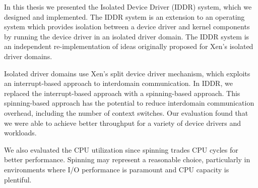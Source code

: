 
In this thesis we presented the Isolated Device Driver (IDDR) system,
which we designed and implemented. 
The IDDR system is an extension to an operating system which provides isolation between
a device driver and kernel components by running the device
driver in an isolated driver domain. The IDDR system is an independent re-implementation 
of ideas originally proposed for Xen's isolated driver domains.

Isolated driver domains use Xen's split device driver
mechanism, which exploits an interrupt-based approach to interdomain communication. 
In IDDR, we replaced the interrupt-based
approach with a spinning-based approach. This spinning-based approach
has the potential to reduce interdomain communication overhead, including
the number of context switches.   Our evaluation found that we were able
to achieve better throughput for a variety of device drivers and workloads.

We also evaluated the CPU utilization since spinning trades CPU cycles 
for better performance.  Spinning may represent a reasonable choice, 
particularly in environments where I/O performance is paramount and CPU 
capacity is plentiful.


